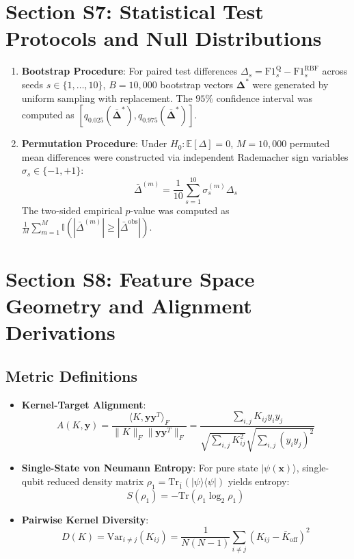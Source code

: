 \documentclass[10pt,letterpaper]{article}
\begin{document}
\section{Section S7: Statistical Test Protocols and Null Distributions}
\label{sec:supp_stats}

\begin{enumerate}
    \item \textbf{Bootstrap Procedure}: For paired test differences $\Delta_s = \text{F1}_s^{\text{Q}} - \text{F1}_s^{\text{RBF}}$ across seeds $s \in \{1, \dots, 10\}$, $B = 10,000$ bootstrap vectors $\mathbf{\Delta}^*$ were generated by uniform sampling with replacement. The $95\%$ confidence interval was computed as $[q_{0.025}(\bar{\mathbf{\Delta}}^*), q_{0.975}(\bar{\mathbf{\Delta}}^*)]$.
    \item \textbf{Permutation Procedure}: Under $H_0: \mathbb{E}[\Delta] = 0$, $M = 10,000$ permuted mean differences were constructed via independent Rademacher sign variables $\sigma_s \in \{-1, +1\}$:
    \begin{equation}
    \bar{\Delta}^{(m)} = \frac{1}{10} \sum_{s=1}^{10} \sigma_s^{(m)} \Delta_s
    \end{equation}
    The two-sided empirical $p$-value was computed as $\frac{1}{M} \sum_{m=1}^M \mathbb{I}(|\bar{\Delta}^{(m)}| \ge |\bar{\Delta}^{\text{obs}}|)$.
\end{enumerate}

\section{Section S8: Feature Space Geometry and Alignment Derivations}
\label{sec:supp_geometry}

\subsection{Metric Definitions}
\begin{itemize}
    \item \textbf{Kernel-Target Alignment}:
    \begin{equation}
    A(K, \mathbf{y}) = \frac{\langle K, \mathbf{y}\mathbf{y}^T \rangle_F}{\|K\|_F \|\mathbf{y}\mathbf{y}^T\|_F} = \frac{\sum_{i, j} K_{ij} y_i y_j}{\sqrt{\sum_{i, j} K_{ij}^2} \sqrt{\sum_{i, j} (y_i y_j)^2}}
    \end{equation}
    \item \textbf{Single-State von Neumann Entropy}: For pure state $| \psi(\mathbf{x}) \rangle$, single-qubit reduced density matrix $\rho_1 = \text{Tr}_{\bar{1}}(|\psi\rangle\langle\psi|)$ yields entropy:
    \begin{equation}
    S(\rho_1) = -\text{Tr}(\rho_1 \log_2 \rho_1)
    \end{equation}
    \item \textbf{Pairwise Kernel Diversity}:
    \begin{equation}
    D(K) = \text{Var}_{i \neq j}(K_{ij}) = \frac{1}{N(N-1)} \sum_{i \neq j} (K_{ij} - \bar{K}_{\text{off}})^2
    \end{equation}
\end{itemize}
\end{document}
